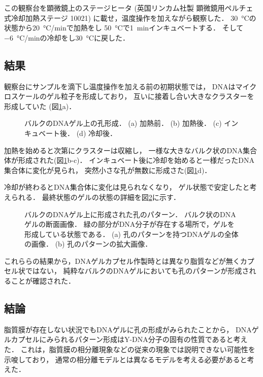 この観察台を顕微鏡上のステージヒータ
(英国リンカム社製 顕微鏡用ペルチェ式冷却加熱ステージ 10021)
に載せ，温度操作を加えながら観察した．
\SI{30}{\celsius}の状態から\SI{20}{\celsius/min}で加熱をし
\SI{50}{\celsius}で\SI{1}{min}インキュベートする．
そして\SI{-6}{\celsius/min}の冷却をし\SI{30}{\celsius}に戻した．


\subsection{結果}
観察台にサンプルを滴下し温度操作を加える前の初期状態では，
DNAはマイクロスケールのゲル粒子を形成しており，
互いに接着し合い大きなクラスターを形成していた
(図\ref{fig:result_dnagel_formation}a)．%
\begin{figure}
    \centering
    
    \caption{バルクのDNAゲル上の孔形成．
        (a) 加熱前．
        (b) 加熱後．
        (c) インキュベート後．
        (d) 冷却後．
    }
    \label{fig:result_dnagel_formation}
\end{figure}
加熱を始めると次第にクラスターは収縮し，
一様な大きなバルク状のDNA集合体が形成された(図\ref{fig:result_dnagel_formation}b-c)．
インキュベート後に冷却を始めると一様だったDNA集合体に変化が見られ，
突然小さな孔が無数に形成さた(図\ref{fig:result_dnagel_formation}d)．

冷却が終わるとDNA集合体に変化は見られなくなり，
ゲル状態で安定したと考えられる．
最終状態のゲルの状態の詳細を図\ref{fig:result_dnagel}に示す．
\begin{figure}
    \centering
    
    \caption{バルクのDNAゲル上に形成された孔のパターン．
        バルク状のDNAゲルの断面画像．
        緑の部分がDNA分子が存在する場所で，ゲルを形成している状態である．
        (a) 孔のパターンを持つDNAゲルの全体の画像．
        (b) 孔のパターンの拡大画像．
    }
    \label{fig:result_dnagel}
\end{figure}

これららの結果から，DNAゲルカプセル作製時とは異なり脂質などが無くカプセル状ではない，
純粋なバルクのDNAゲルにおいても孔のパターンが形成されることが確認された．


\subsection{結論}
脂質膜が存在しない状況でもDNAゲルに孔の形成がみられたことから，
DNAゲルカプセルにみられるパターン形成はY-DNA分子の固有の性質であると考えた．
これは，脂質膜の相分離現象などの従来の現象では説明できない可能性を示唆しており，
通常の相分離モデルとは異なるモデルを考える必要があると考えた．


